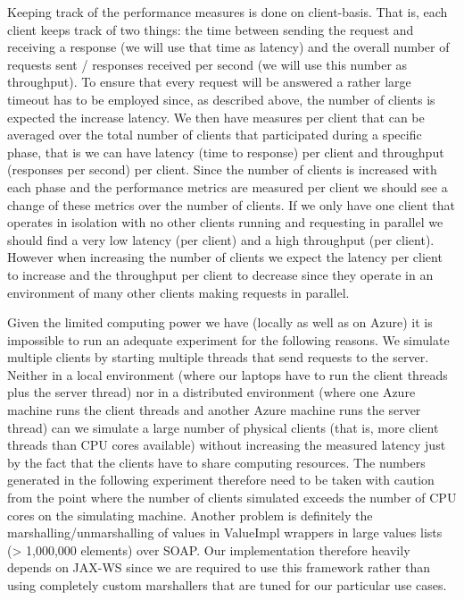 \documentclass[12pt,a4paper]{article}
\begin{document}
  Keeping track of the performance measures is done on client-basis. That is, each client keeps track of two things: the time between sending the request and receiving a response (we will use that time as latency) and the overall number of requests sent / responses received per second (we will use this number as throughput). To ensure that every request will be answered a rather large timeout has to be employed since, as described above, the number of clients is expected the increase latency. We then have measures per client that can be averaged over the total number of clients that participated during a specific phase, that is we can have latency (time to response) per client and throughput (responses per second) per client. Since the number of clients is increased with each phase and the performance metrics are measured per client we should see a change of these metrics over the number of clients. If we only have one client that operates in isolation with no other clients running and requesting in parallel we should find a very low latency (per client) and a high throughput (per client). However when increasing the number of clients we expect the latency per client to increase and the throughput per client to decrease since they operate in an environment of many other clients making requests in parallel.
  
  Given the limited computing power we have (locally as well as on Azure) it is impossible to run an adequate experiment for the following reasons. We simulate multiple clients by starting multiple threads that send requests to the server. Neither in a local environment (where our laptops have to run the client threads plus the server thread) nor in a distributed environment (where one Azure machine runs the client threads and another Azure machine runs the server thread) can we simulate a large number of physical clients (that is, more client threads than CPU cores available) without increasing the measured latency just by the fact that the clients have to share computing resources. The numbers generated in the following experiment therefore need to be taken with caution from the point where the number of clients simulated exceeds the number of CPU cores on the simulating machine. Another problem is definitely the marshalling/unmarshalling of values in ValueImpl wrappers in large values lists (> 1,000,000 elements) over SOAP. Our implementation therefore heavily depends on JAX-WS since we are required to use this framework rather than using completely custom marshallers that are tuned for our particular use cases.
\end{document}
